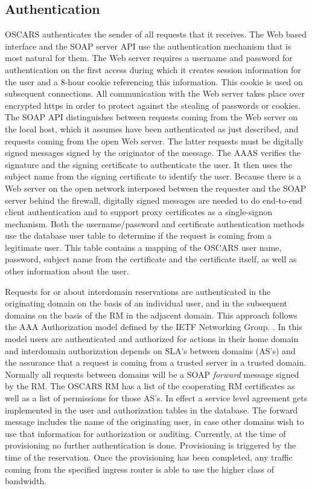 \documentclass[conference]{IEEEtran}
\begin{document}
\subsection{Authentication}
OSCARS authenticates the sender of all requests that it receives.
The Web based interface and the SOAP server API use the
authentication mechanism that is most natural for them. The Web server
requires a username and password for authentication on the first
access during which it creates session information for the user and a
8-hour cookie referencing this information. This cookie is used on subsequent
connections. All communication with the Web server takes place over
encrypted https in order to protect against the stealing of passwords
or cookies. The SOAP API distinguishes between requests coming from
the Web server on the local host, which it assumes have been authenticated
as just described, and requests coming from the open Web server. The 
latter requests  must be digitally signed messages \cite{eastlake} signed by the
originator of the message. The AAAS verifies the signature and the signing 
certificate to authenticate
the user. It then uses the subject name from the signing certificate
to identify the user. Because there is a Web server on the open network 
interposed between the
requester and the SOAP server behind the firewall, digitally signed messages 
are 
needed to do end-to-end client authentication and to support proxy certificates
as a single-signon mechanism. Both the username/password and certificate 
authentication methods use the database user table to
determine if the request is coming from a legitimate user. This table
contains a mapping of the OSCARS user name, password, subject name
from the certificate and the certificate itself, as well as other
information about the user.

Requests for or about interdomain
reservations are authenticated in the originating domain on the basis
of an individual user, and in the subsequent domains on the basis of
the RM in the adjacent domain.  This approach follows the AAA  Authorization
model defined by the IETF Networking Group. \cite{AAA}. In this model
users are authenticated and authorized for actions in their home domain and 
interdomain authorization depends on SLA's between domains (AS's) and the
assurance that  a request is coming from a trusted server in a trusted domain. Normally all requests between domains will be a SOAP \emph{forward}  message
signed by the RM. The OSCARS RM has a list of the
cooperating RM certificates as well as a list of
permissions for those AS's. In effect a service level agreement gets
implemented in the user and authorization tables in the database. The forward
message includes the name of the originating user, in case other
domains wish to use that information for authorization or auditing.
Currently, at the time of provisioning no further authentication is
done. Provisioning is triggered by the time of the reservation. Once
the provisioning has been completed, any traffic coming from the
specified ingress router is able to use the higher class of bandwidth.
\end{document}

